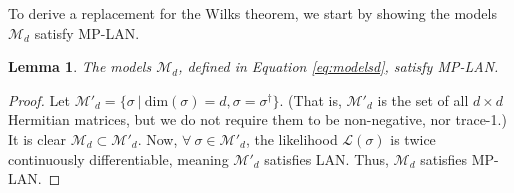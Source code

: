 \documentclass[aps,pra, twocolumn]{revtex4-1}
\newcommand{\M}{\mathcal{M}}
\newcommand{\cL}{\mathcal{L}}
\newtheorem{lem}{Lemma}
\begin{document}
To derive a replacement for the Wilks theorem, we start by showing  the models $\M_{d}$ satisfy MP-LAN.
\begin{lem}
The models $\M_{d}$, defined in Equation \eqref{eq:modelsd}, satisfy MP-LAN.
\end{lem}

\begin{proof} Let $\M'_{d} = \{\sigma ~|~\mathrm{dim}(\sigma) = d, \sigma = \sigma^{\dagger}\}$. (That is, $\M'_{d}$ is the set of all $d \times d$ Hermitian matrices, but we do not require them to be non-negative, nor trace-1.) It is clear $\M_{d} \subset \M'_{d}$. Now, $\forall ~\sigma \in \M'_{d}$, the likelihood $\cL(\sigma)$ is twice continuously differentiable, meaning $\M'_{d}$ satisfies LAN. Thus, $\M_{d}$ satisfies MP-LAN.
\end{proof}
\end{document}
